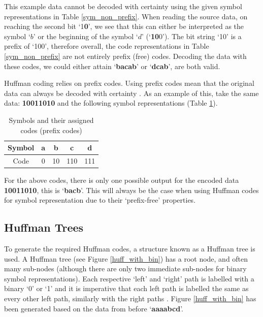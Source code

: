 \documentclass[12pt]{article}
\begin{document}
This example data cannot be decoded with certainty using the given symbol representations in Table \ref{sym_non_prefix}. When reading the source data, on reaching the second bit `1\textbf{0}', we see that this can either be interpreted as the symbol `$b$' or the beginning of the symbol `$d$' (`\textbf{10}$0$'). The bit string `10' is a prefix of `100', therefore overall, the code representations in Table \ref{sym_non_prefix} are not entirely prefix (free) codes. Decoding the data with these codes, we could either attain `\textbf{bacab}' or `\textbf{dcab}', are both valid.

Huffman coding relies on prefix codes. Using prefix codes mean that the original data can always be decoded with certainty \citep[p.~31-32]{intro_to_dc}. As an example of this, take the same data: \textbf{10011010} and the following symbol representations (Table \ref{sym_w_prefix}).
\begin{table}[H]
	\centering
	\begin{tabular}{|c|c|c|c|c|}
		\hline
		Symbol & a & b & c & d\\
		\hline
		Code & 0 & 10 & 110 & 111\\
		\hline
	\end{tabular}
	\caption{Symbols and their assigned codes (prefix codes)}
	\label{sym_w_prefix}
\end{table}

For the above codes, there is only one possible output for the encoded data \textbf{10011010}, this is `\textbf{bacb}'. This will always be the case when using Huffman codes for symbol representation due to their `prefix-free' properties.

\subsection{Huffman Trees}{\label{sec_huff_trees}}

To generate the required Huffman codes, a structure known as a Huffman tree is used. A Huffman tree (see Figure \ref{huff_with_bin}) has a root node, and often many sub-nodes (although there are only two immediate sub-nodes for binary symbol representations). Each respective `left' and `right' path is labelled with a binary `0' or `1' and it is imperative that each left path is labelled the same as every other left path, similarly with the right paths \citep[pp.~42-48]{intro_to_dc}. Figure \ref{huff_with_bin} has been generated based on the data from before `\textbf{aaaabcd}'.
\end{document}
